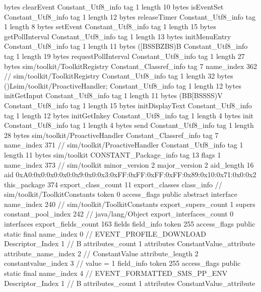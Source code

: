 {{{			bytes	clearEvent
		}
		Constant_Utf8_info {
			tag	1
			length	10
			bytes	isEventSet
		}
		Constant_Utf8_info {
			tag	1
			length	12
			bytes	releaseTimer
		}
		Constant_Utf8_info {
			tag	1
			length	8
			bytes	setEvent
		}
		Constant_Utf8_info {
			tag	1
			length	15
			bytes	getPollInterval
		}
		Constant_Utf8_info {
			tag	1
			length	13
			bytes	initMenuEntry
		}
		Constant_Utf8_info {
			tag	1
			length	11
			bytes	([BSSBZBS)B
		}
		Constant_Utf8_info {
			tag	1
			length	19
			bytes	requestPollInterval
		}
		Constant_Utf8_info {
			tag	1
			length	27
			bytes	sim/toolkit/ToolkitRegistry
		}
		Constant_Classref_info {
			tag	7
			name_index	362		// sim/toolkit/ToolkitRegistry
		}
		Constant_Utf8_info {
			tag	1
			length	32
			bytes	()Lsim/toolkit/ProactiveHandler;
		}
		Constant_Utf8_info {
			tag	1
			length	12
			bytes	initGetInput
		}
		Constant_Utf8_info {
			tag	1
			length	11
			bytes	(BB[BSSSS)V
		}
		Constant_Utf8_info {
			tag	1
			length	15
			bytes	initDisplayText
		}
		Constant_Utf8_info {
			tag	1
			length	12
			bytes	initGetInkey
		}
		Constant_Utf8_info {
			tag	1
			length	4
			bytes	init
		}
		Constant_Utf8_info {
			tag	1
			length	4
			bytes	send
		}
		Constant_Utf8_info {
			tag	1
			length	28
			bytes	sim/toolkit/ProactiveHandler
		}
		Constant_Classref_info {
			tag	7
			name_index	371		// sim/toolkit/ProactiveHandler
		}
		Constant_Utf8_info {
			tag	1
			length	11
			bytes	sim/toolkit
		}
		CONSTANT_Package_info {
			tag	13
			flags	1
			name_index	373		// sim/toolkit
			minor_version	2
			major_version	2
			aid_length	16
			aid	0xA0:0x0:0x0:0x0:0x9:0x0:0x3:0xFF:0xFF:0xFF:0xFF:0x89:0x10:0x71:0x0:0x2
		}
	}
	this_package	374
	export_class_count	11
	export_classes {
		class_info {		// sim/toolkit/ToolkitConstants
			token	0
			access_flags	public abstract interface
			name_index	240		// sim/toolkit/ToolkitConstants
			export_supers_count	1
			supers {
				constant_pool_index	242		// java/lang/Object
			}
			export_interfaces_count	0
			interfaces {
			}
			export_fields_count	163
			fields {
			field_info {
				token	255
				access_flags	public static final
				name_index	0		// EVENT_PROFILE_DOWNLOAD
				Descriptor_Index	1		// B
				attributes_count	1
				attributes {
				ConstantValue_attribute {
					attribute_name_index	2		// ConstantValue
					attribute_length	2
					constantvalue_index	3		// value = 1
				}
				}
			}
			field_info {
				token	255
				access_flags	public static final
				name_index	4		// EVENT_FORMATTED_SMS_PP_ENV
				Descriptor_Index	1		// B
				attributes_count	1
				attributes {
				ConstantValue_attribute {
}}}}}}}
